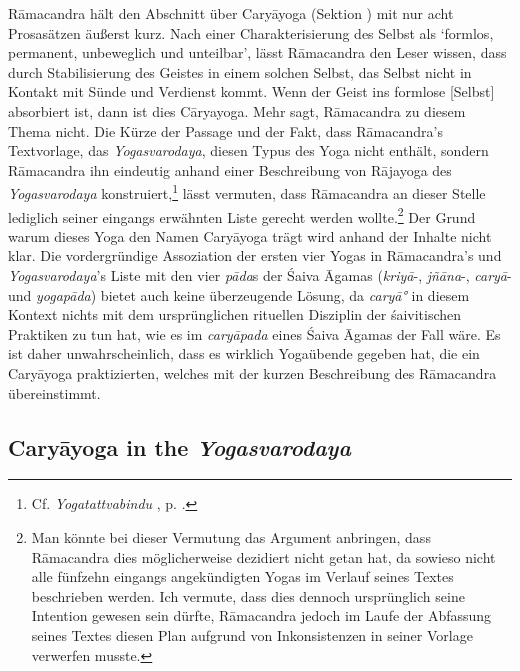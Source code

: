 Rāmacandra hält den Abschnitt über Caryāyoga (Sektion ) mit nur acht Prosasätzen äußerst kurz. Nach einer Charakterisierung des Selbst als `formlos, permanent, unbeweglich und unteilbar', lässt Rāmacandra den Leser wissen, dass durch Stabilisierung des Geistes in einem solchen Selbst, das Selbst nicht in Kontakt mit Sünde und Verdienst kommt. Wenn der Geist ins formlose [Selbst] absorbiert ist, dann ist dies Cāryayoga. Mehr sagt, Rāmacandra zu diesem Thema nicht. Die Kürze der Passage und der Fakt, dass Rāmacandra's Textvorlage, das \textit{Yogasvarodaya}, diesen Typus des Yoga nicht enthält, sondern Rāmacandra ihn eindeutig anhand einer Beschreibung von Rājayoga des \textit{Yogasvarodaya} konstruiert,\footnote{Cf. \textit{Yogatattvabindu} , p. \pageref{caryayoga}.} lässt vermuten, dass Rāmacandra an dieser Stelle lediglich seiner eingangs erwähnten Liste gerecht werden wollte.\footnote{Man könnte bei dieser Vermutung das Argument anbringen, dass Rāmacandra dies möglicherweise dezidiert nicht getan hat, da sowieso nicht alle fünfzehn eingangs angekündigten Yogas im Verlauf seines Textes beschrieben werden. Ich vermute, dass dies dennoch ursprünglich seine Intention gewesen sein dürfte, Rāmacandra jedoch im Laufe der Abfassung seines Textes diesen Plan aufgrund von Inkonsistenzen in seiner Vorlage verwerfen musste.} Der Grund warum dieses Yoga den Namen Caryāyoga trägt wird anhand der Inhalte nicht klar. Die vordergründige Assoziation der ersten vier Yogas in Rāmacandra's und \textit{Yogasvarodaya}'s Liste mit den vier \textit{pāda}s der Śaiva Āgamas (\textit{kriyā}-, \textit{jñāna}-, \textit{caryā}- und \textit{yogapāda}) bietet auch keine überzeugende Lösung, da \textit{caryā°} in diesem Kontext nichts mit dem ursprünglichen rituellen Disziplin der śaivitischen Praktiken zu tun hat, wie es im \textit{caryāpada} eines Śaiva Āgamas der Fall wäre. Es ist daher unwahrscheinlich, dass es wirklich Yogaübende gegeben hat, die ein Caryāyoga praktizierten, welches mit der kurzen Beschreibung des Rāmacandra übereinstimmt. 

\subsection{Caryāyoga in the \textit{Yogasvarodaya}}

